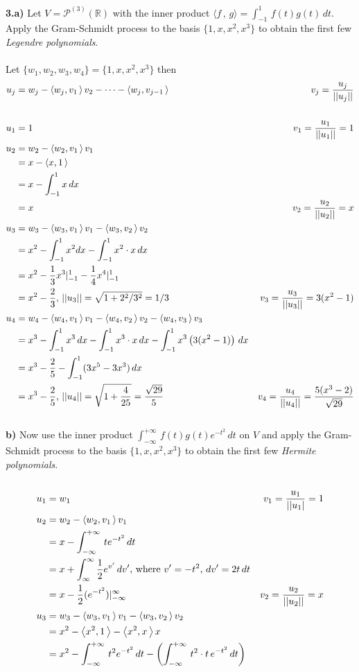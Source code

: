 \documentclass[11pt]{amsart}
\theoremstyle{definition}  %
\newcommand{\R}{\mathbb{R}}
\begin{document}
\newpage 
\vskip 0.1cm
\noindent
{\bf 3.a)}  Let $ V = \mathcal{P}^{(3)}(\R)$ with the inner product $\langle f \, , \, g \rangle = \int_{-1}^1 \, f(t)g(t) \, dt$. Apply the Gram-Schmidt process to the basis $\{1, x, x^2, x^3 \}$
to obtain the first few {\it Legendre polynomials}. \\
\\
Let $\{w_1, w_2, w_3, w_4\} = \{1, x, x^2, x^3 \}$ then 
\begin{align*}
	u_j &= w_j-\left\langle w_j,v_1 \,\right\rangle v_2-\cdots-\left\langle w_j,v_{j-1} \,\right\rangle & v_j = \frac{u_j}{||u_j||}\\
	\\
	u_1 &= 1 & v_1 = \frac{u_1}{||u_1||}= 1\\
	u_2 &= w_2 - \left\langle w_2,v_1 \,\right\rangle v_1 \\
	&= x - \left\langle x,1 \,\right\rangle \\
	&= x - \int_{-1}^1 x \,dx \\
	&= x & v_2 = \frac{u_2}{||u_2||} = x\\
	u_3 &= w_3 - \left\langle w_3,v_1 \,\right\rangle v_1 - \left\langle w_3,v_2 \,\right\rangle v_2\\
	&= x^2 - \int_{-1}^1 x^2 dx - \int_{-1}^1 x^2\cdot x \, dx \\
	&= x^2 - \frac{1}{3}x^3|_{-1}^1-\frac{1}{4}x^4|_{-1}^1\\
	&= x^2 - \frac{2}{3},\, ||u_3|| = \sqrt{1+2^2/3^2} = 1/3 & v_3 = \frac{u_3}{||u_3||} = 3(x^2-1)\\
	u_4 &= w_4 - \left\langle w_4,v_1 \,\right\rangle v_1 - \left\langle w_4,v_2 \,\right\rangle v_2 - \left\langle w_4,v_3 \,\right\rangle v_3\\
	&= x^3 - \int_{-1}^1 x^3\,dx - \int_{-1}^1 x^3\cdot x\,dx - \int_{-1}^1 x^3\left( 3(x^2-1) \right) \,dx \\
	&= x^3 - \frac{2}{5} - \int_{-1}^1 (3x^5-3x^3)\, dx \\
	&= x^3 -\frac{2}{5}, \, ||u_4|| = \sqrt{1+\frac{4}{25}}=\frac{\sqrt{29}}{5} & v_4 = \frac{u_4}{||u_4||} = \frac{5(x^3-2)}{\sqrt{29}}
\end{align*}
\\
\newpage
{\bf b)} Now use the inner product $\int_{-\infty}^{+\infty} \, f(t) g(t) e^{-t^2} \, dt$ on $V$  and apply the Gram-Schmidt process to the  basis $\{1, x, x^2, x^3 \}$ to obtain the first few {\it Hermite polynomials}. \\
\\
\begin{align*}
	u_1 &= w_1 & v_1 = \frac{u_1}{||u_1|} = 1 \\
	u_2 &= w_2 - \left\langle w_2, v_1 \,\right\rangle v_1 \\
	&= x - \int_{-\infty}^{+\infty} \, t e^{-t^2} \, dt \\
	&= x + \int_{\infty}^\infty \frac{1}{2}e^{v'} \, dv', \,\text{where } v' = -t^2, \, dv' = 2t\,dt \\
	&= x - \frac{1}{2}(e^{-t^2})|_{-\infty}^\infty & v_2 = \frac{u_2}{||u_2||} = x\\
	u_3 &= w_3 - \left\langle w_3,v_1 \,\right\rangle v_1 - \left\langle w_3,v_2 \,\right\rangle v_2\\
	&= x^2-\left\langle x^2,1 \,\right\rangle-\left\langle x^2,x \,\right\rangle x\\
	&= x^2 - \int_{-\infty}^{+\infty} \, t^2 e^{-t^2} \, dt - \left(\int_{-\infty}^{+\infty} \, t^2 \cdot t \, e^{-t^2} \, dt\right)
\end{align*}
\end{document}
